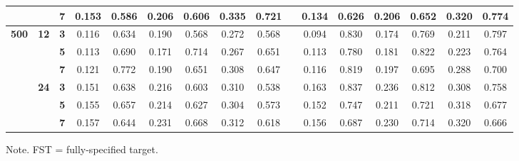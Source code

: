 \documentclass[a4paper,man,natbib]{apa6}
\begin{document}
\begin{table}[]
{\begin{tabular}{cccccccccccccccc}
			&
			&
			\textbf{7} &
			0.153 &
			0.586 &
			0.206 &
			0.606 &
			0.335 &
			0.721 &
			&
			0.134 &
			0.626 &
			0.206 &
			0.652 &
			0.320 &
			0.774 \\ \hline
			\multirow{6}{*}{\textbf{500}} &
			\multirow{3}{*}{\textbf{12}} &
			\textbf{3} &
			0.116 &
			0.634 &
			0.190 &
			0.568 &
			0.272 &
			0.568 &
			&
			0.094 &
			0.830 &
			0.174 &
			0.769 &
			0.211 &
			0.797 \\ \cline{3-16} 
			&
			&
			\textbf{5} &
			0.113 &
			0.690 &
			0.171 &
			0.714 &
			0.267 &
			0.651 &
			&
			0.113 &
			0.780 &
			0.181 &
			0.822 &
			0.223 &
			0.764 \\ \cline{3-16} 
			&
			&
			\textbf{7} &
			0.121 &
			0.772 &
			0.190 &
			0.651 &
			0.308 &
			0.647 &
			&
			0.116 &
			0.819 &
			0.197 &
			0.695 &
			0.288 &
			0.700 \\ \cline{2-16} 
			&
			\multirow{3}{*}{\textbf{24}} &
			\textbf{3} &
			0.151 &
			0.638 &
			0.216 &
			0.603 &
			0.310 &
			0.538 &
			&
			0.163 &
			0.837 &
			0.236 &
			0.812 &
			0.308 &
			0.758 \\ \cline{3-16} 
			&
			&
			\textbf{5} &
			0.155 &
			0.657 &
			0.214 &
			0.627 &
			0.304 &
			0.573 &
			&
			0.152 &
			0.747 &
			0.211 &
			0.721 &
			0.318 &
			0.677 \\ \cline{3-16} 
			&
			&
			\textbf{7} &
			0.157 &
			0.644 &
			0.231 &
			0.668 &
			0.312 &
			0.618 &
			&
			0.156 &
			0.687 &
			0.230 &
			0.714 &
			0.320 &
			0.666 \\ \hline
		\end{tabular}%
	}
\begin{tablenotes}[flushleft]
\item Note. FST = fully-specified target.	
\end{tablenotes}
\end{table}




\end{document}

